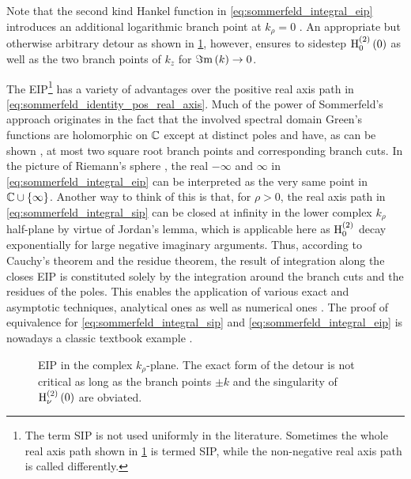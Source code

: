 Note that the second kind Hankel function in \eqref{eq:sommerfeld_integral_eip}
introduces an additional logarithmic branch point at $k_\rho = 0$
\cite{Olver2010}.
An appropriate but otherwise arbitrary detour as shown in \cref{fig:si_paths},
however, ensures to sidestep $\besselh{2}{0} \left(0\right)$ as well as the
two branch points of $k_z$ for $\imag{k} \to 0$.
	
The \ac{EIP}\footnote{The term \acf{SIP} is not used uniformly in the
literature.
Sometimes the whole real axis path shown in \cref{fig:si_paths} is termed
\ac{SIP}, while the non-negative real axis path is called differently.}
has a variety of advantages over the positive real axis path in
\eqref{eq:sommerfeld_identity_pos_real_axis}.
Much of the power of Sommerfeld's approach originates in the fact that the
involved spectral domain Green's functions are holomorphic on $\C$ except at 
distinct poles and have, as can be shown \cite{Michalski2016b}, at most two
square root branch points and corresponding branch cuts.
In the picture of Riemann's sphere \cite[180]{Meyberg2006}, the real
$-\infty$ and $\infty$ in \eqref{eq:sommerfeld_integral_eip} can be interpreted
as the very same point in $\C \cup \left\{\infty\right\}$.
Another way to think of this is that, for $\rho > 0$, the real axis path in
\eqref{eq:sommerfeld_integral_sip} can be closed at infinity in the lower
complex $k_\rho$ half-plane by virtue of Jordan's lemma, which is applicable
here as $\besselh{2}{0}$ decay exponentially for large negative imaginary
arguments.
Thus, according to Cauchy's theorem and the residue theorem, the result of
integration along the closes \ac{EIP} is constituted solely by the integration
around the branch cuts and the residues of the poles.
This enables the application of various exact and asymptotic techniques,
analytical ones as well as numerical ones
\cite{Sommerfeld1964,Chew1999,Michalski1985a,Michalski2016b}.
The proof of equivalence for \eqref{eq:sommerfeld_integral_sip} and
\eqref{eq:sommerfeld_integral_eip} is nowadays a classic textbook example
\cite[203]{Sommerfeld1964}.

\begin{figure}
	\centering
	\caption[\Acf{EIP}]
	{\Acf{EIP} in the complex $k_\rho$-plane.
	The exact form of the detour is not critical as long as the branch points
	$\pm k$ and the singularity of $\besselh{2}{\nu} \left(0\right)$ are
	obviated.}
	\label{fig:si_paths}
\end{figure}


